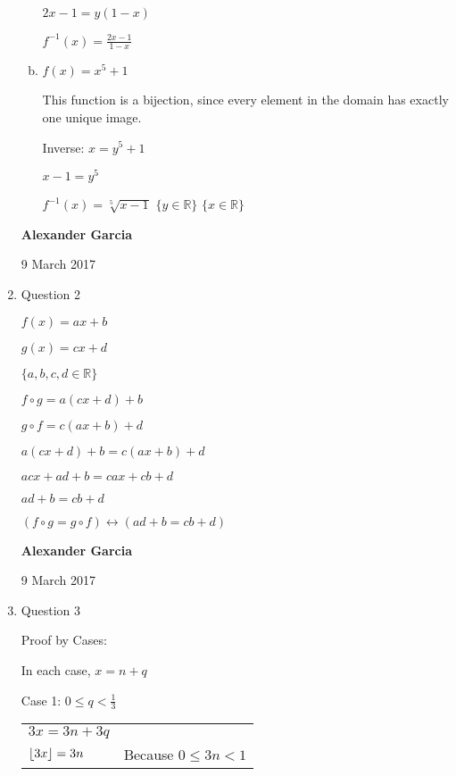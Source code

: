 \documentclass[11pt]{article}
\DeclarePairedDelimiter\floor{\lfloor}{\rfloor}
\begin{document}
\begin{enumerate}
\begin{enumerate}[(a)]
				$2x - 1 = y(1 - x)$

				$f^{-1}(x) = \frac{2x-1}{1-x}$ \\

			\item $f(x) = x^5 + 1$

				This function is a bijection, since every element in the domain has exactly one unique
				image.

				Inverse: $x = y^5 + 1$

				$x-1 = y^5$

				$f^{-1}(x) = \sqrt[5]{x-1}$
				$\{y \in \mathbb{R}\}$
				$\{x \in \mathbb{R}\}$


		\end{enumerate}

	\newpage

	\textbf{Alexander Garcia}

	9 March 2017 \\

	\item Question 2

		$f(x) = ax + b$

		$g(x) = cx + d$

		$\{a, b, c, d \in \mathbb{R}\}$

		$f \circ g = a(cx + d) + b$

		$g \circ f = c(ax + b) + d$

		$a(cx + d) + b = c(ax + b) + d$

		$acx + ad + b = cax + cb + d$

		$ad + b = cb + d$

		$(f \circ g = g \circ f) \leftrightarrow
		(ad + b = cb + d)$ \\


		\newpage

		\textbf{Alexander Garcia}

		9 March 2017 \\

	\item Question 3

		Proof by Cases:

		In each case, $x = n + q$

		Case 1: $0 \leq q < \frac{1}{3}$

		\begin{tabular}{ll}
			$3x = 3n + 3q$ \\

			$\floor*{3x} = 3n$ &
			Because $0 \leq 3n < 1$ \\


\end{tabular}
\end{enumerate}
\end{document}
